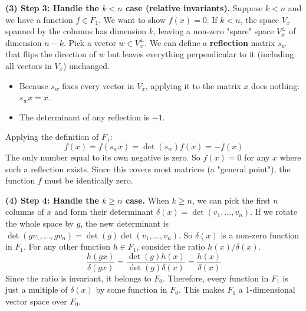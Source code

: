 \begin{solution}
\textbf{(3) Step 3: Handle the $k < n$ case (relative invariants).}
Suppose $k < n$ and we have a function $f \in F_1$. We want to show $f(x) = 0$.
If $k < n$, the space $V_x$ spanned by the columns has dimension $k$, leaving a non-zero "spare" space $V_x^\perp$ of dimension $n-k$.
Pick a vector $w \in V_x^\perp$. We can define a \textbf{reflection} matrix $s_w$ that flips the direction of $w$ but leaves everything perpendicular to it (including all vectors in $V_x$) unchanged.
\begin{itemize}
    \item Because $s_w$ fixes every vector in $V_x$, applying it to the matrix $x$ does nothing: $s_w x = x$.
    \item The determinant of any reflection is $-1$.
\end{itemize}
Applying the definition of $F_1$:
\[ f(x) = f(s_w x) = \det(s_w) f(x) = -f(x) \]
The only number equal to its own negative is zero. So $f(x) = 0$ for any $x$ where such a reflection exists. Since this covers most matrices (a "general point"), the function $f$ must be identically zero.

\textbf{(4) Step 4: Handle the $k \geq n$ case.}
When $k \geq n$, we can pick the first $n$ columns of $x$ and form their determinant $\delta(x) = \det(v_1, \dots, v_n)$.
If we rotate the whole space by $g$, the new determinant is $\det(gv_1, \dots, gv_n) = \det(g) \det(v_1, \dots, v_n)$.
So $\delta(x)$ is a non-zero function in $F_1$.
For any other function $h \in F_1$, consider the ratio $h(x) / \delta(x)$.
\[ \frac{h(gx)}{\delta(gx)} = \frac{\det(g) h(x)}{\det(g) \delta(x)} = \frac{h(x)}{\delta(x)} \]
Since the ratio is invariant, it belongs to $F_0$.
Therefore, every function in $F_1$ is just a multiple of $\delta(x)$ by some function in $F_0$. This makes $F_1$ a 1-dimensional vector space over $F_0$.
\end{solution}

